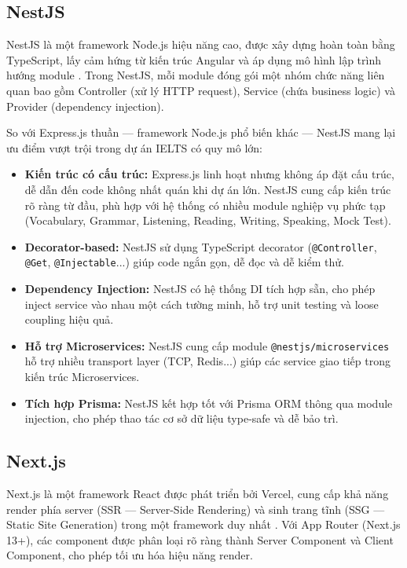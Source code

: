 \documentclass[a4paper,12pt]{extreport}
\begin{document}
\subsection{NestJS}

NestJS là một framework Node.js hiệu năng cao, được xây dựng hoàn toàn bằng TypeScript, lấy cảm hứng từ kiến trúc Angular và áp dụng mô hình lập trình hướng module \cite{nestjs-docs}. Trong NestJS, mỗi module đóng gói một nhóm chức năng liên quan bao gồm Controller (xử lý HTTP request), Service (chứa business logic) và Provider (dependency injection).

So với Express.js thuần — framework Node.js phổ biến khác — NestJS mang lại ưu điểm vượt trội trong dự án IELTS có quy mô lớn:

\begin{itemize}
    \item \textbf{Kiến trúc có cấu trúc:} Express.js linh hoạt nhưng không áp đặt cấu trúc, dễ dẫn đến code không nhất quán khi dự án lớn. NestJS cung cấp kiến trúc rõ ràng từ đầu, phù hợp với hệ thống có nhiều module nghiệp vụ phức tạp (Vocabulary, Grammar, Listening, Reading, Writing, Speaking, Mock Test).
    \item \textbf{Decorator-based:} NestJS sử dụng TypeScript decorator (\texttt{@Controller}, \texttt{@Get}, \texttt{@Injectable}...) giúp code ngắn gọn, dễ đọc và dễ kiểm thử.
    \item \textbf{Dependency Injection:} NestJS có hệ thống DI tích hợp sẵn, cho phép inject service vào nhau một cách tường minh, hỗ trợ unit testing và loose coupling hiệu quả.
    \item \textbf{Hỗ trợ Microservices:} NestJS cung cấp module \texttt{@nestjs/microservices} hỗ trợ nhiều transport layer (TCP, Redis...) giúp các service giao tiếp trong kiến trúc Microservices.
    \item \textbf{Tích hợp Prisma:} NestJS kết hợp tốt với Prisma ORM thông qua module injection, cho phép thao tác cơ sở dữ liệu type-safe và dễ bảo trì.
\end{itemize}

\subsection{Next.js}

Next.js là một framework React được phát triển bởi Vercel, cung cấp khả năng render phía server (SSR — Server-Side Rendering) và sinh trang tĩnh (SSG — Static Site Generation) trong một framework duy nhất \cite{nextjs-docs}. Với App Router (Next.js 13+), các component được phân loại rõ ràng thành Server Component và Client Component, cho phép tối ưu hóa hiệu năng render.
\end{document}
